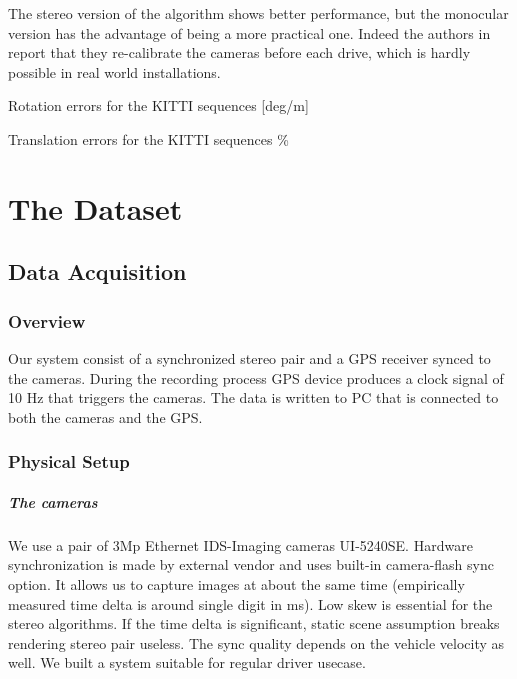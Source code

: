 \documentclass{report}
\begin{document}
The stereo version of the algorithm shows better performance, but the
monocular version has the advantage of being a more practical one.
Indeed the authors in~\cite{Geiger2012} report that they re-calibrate
the cameras before each drive, which is hardly possible in real world
installations.

\begin{table}
  \centering
  \caption{Rotation errors for the KITTI sequences [deg/m]}
  \label{table:rot_err}
  \smallskip\noindent
  \resizebox{\linewidth}{!}{%
    
  }
\end{table}

\begin{table}
  \centering
  \caption{Translation errors for the KITTI sequences \% }
  \label{table:trans_err}
  \smallskip\noindent
  \resizebox{\linewidth}{!}{%
    
  }
\end{table}

\chapter{The Dataset}
\section{Data Acquisition}

\subsection{Overview}
Our system consist of a synchronized stereo pair and a GPS receiver synced to the cameras.  During the recording process GPS device produces a clock signal of 10 Hz that triggers the cameras.  The data is written to PC that is connected to both the cameras and the GPS.

\subsection{Physical Setup}
\paragraph{The cameras} We use a pair of 3Mp Ethernet IDS-Imaging
cameras UI-5240SE.  Hardware synchronization is made by external
vendor and uses built-in camera-flash sync option.  It allows us to
capture images at about the same time (empirically measured time delta
is around single digit in ms).  Low skew is essential for the stereo
algorithms.  If the time delta is significant, static scene assumption
breaks rendering stereo pair useless.  The sync quality depends on the
vehicle velocity as well. We built a system suitable for regular
driver usecase.
\end{document}

